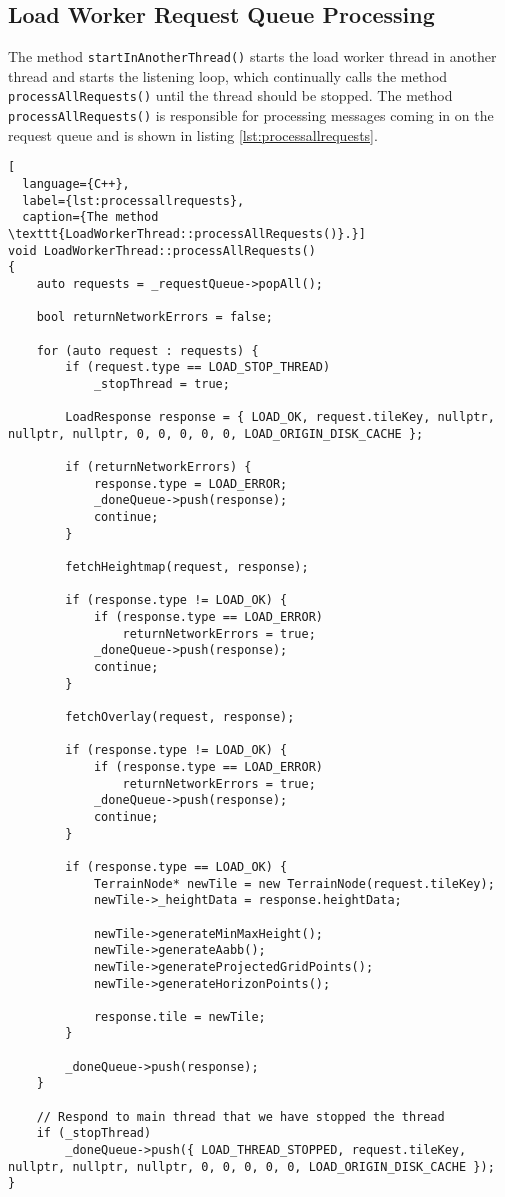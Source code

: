 \subsection{Load Worker Request Queue Processing}
The method \texttt{startInAnotherThread()}
starts the load worker thread in another thread and 
starts the listening loop, which continually calls 
the method \texttt{processAllRequests()} until 
the thread should be stopped.
The method \texttt{processAllRequests()} is responsible for processing
messages coming in on the request queue and is shown 
in listing \ref{lst:processallrequests}.

\begin{lstlisting}[
  language={C++},
  label={lst:processallrequests},
  caption={The method \texttt{LoadWorkerThread::processAllRequests()}.}]
void LoadWorkerThread::processAllRequests()
{
    auto requests = _requestQueue->popAll();

    bool returnNetworkErrors = false;

    for (auto request : requests) {
        if (request.type == LOAD_STOP_THREAD)
            _stopThread = true;
        
        LoadResponse response = { LOAD_OK, request.tileKey, nullptr, nullptr, nullptr, 0, 0, 0, 0, 0, LOAD_ORIGIN_DISK_CACHE };

        if (returnNetworkErrors) {
            response.type = LOAD_ERROR;
            _doneQueue->push(response);
            continue;
        }

        fetchHeightmap(request, response);

        if (response.type != LOAD_OK) {
            if (response.type == LOAD_ERROR)
                returnNetworkErrors = true;
            _doneQueue->push(response);
            continue;
        }

        fetchOverlay(request, response);

        if (response.type != LOAD_OK) {
            if (response.type == LOAD_ERROR)
                returnNetworkErrors = true;
            _doneQueue->push(response);
            continue;
        }

        if (response.type == LOAD_OK) {
            TerrainNode* newTile = new TerrainNode(request.tileKey);
            newTile->_heightData = response.heightData;

            newTile->generateMinMaxHeight();
            newTile->generateAabb();
            newTile->generateProjectedGridPoints();
            newTile->generateHorizonPoints();

            response.tile = newTile;
        }

        _doneQueue->push(response);
    }

    // Respond to main thread that we have stopped the thread
    if (_stopThread)
        _doneQueue->push({ LOAD_THREAD_STOPPED, request.tileKey, nullptr, nullptr, nullptr, 0, 0, 0, 0, 0, LOAD_ORIGIN_DISK_CACHE });
}
\end{lstlisting}

